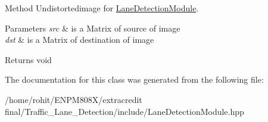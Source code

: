 Method Undistortedimage for \hyperlink{classLaneDetectionModule}{Lane\+Detection\+Module}. 


\begin{DoxyParams}{Parameters}
{\em src} & is a Matrix of source of image \\
\hline
{\em dst} & is a Matrix of destination of image\\
\hline
\end{DoxyParams}
\begin{DoxyReturn}{Returns}
void 
\end{DoxyReturn}


The documentation for this class was generated from the following file\+:\begin{DoxyCompactItemize}
\item 
/home/rohit/\+E\+N\+P\+M808\+X/extracredit final/\+Traffic\+\_\+\+Lane\+\_\+\+Detection/include/Lane\+Detection\+Module.\+hpp\end{DoxyCompactItemize}
